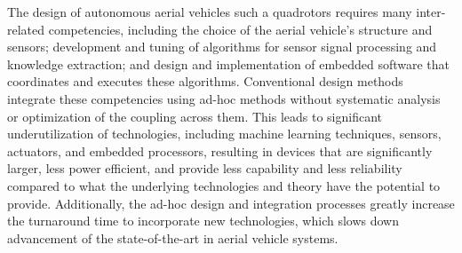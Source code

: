 
The design of autonomous aerial vehicles such a quadrotors
requires many inter-related competencies, 
including 
the choice of  the aerial vehicle's structure and sensors; 
development and tuning of algorithms for sensor signal processing and knowledge extraction;
and design and implementation of embedded software that 
coordinates and executes these algorithms.
Conventional design methods integrate these competencies using
ad-hoc methods without systematic analysis or optimization
of the coupling across them. This leads to significant underutilization
of technologies, including machine learning techniques, 
sensors, actuators, and embedded processors, resulting
in devices that are significantly larger, less power efficient,
and provide less capability and less reliability compared
to what the underlying technologies and theory have the potential to provide.
Additionally, the ad-hoc design and integration processes greatly increase
the turnaround time to incorporate new technologies, which
slows down advancement of the state-of-the-art in aerial vehicle
systems.

